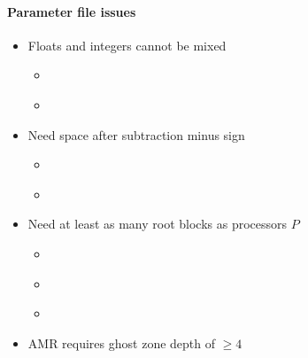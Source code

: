 \begin{frame}[fragile]
\secframetitle{\ssParamIntro}
\framesubtitle{Parameter file issues}

\begin{itemize}
   \item Floats and integers cannot be mixed
   \begin{itemize}
     \item[\frownie] \textcolor{red}{}
     \item[\smiley] \textcolor{green!50!black}{}
   \end{itemize}

   \item Need space after subtraction minus sign
   \begin{itemize}
     \item[\frownie] \textcolor{red}{}
     \item[\smiley] \textcolor{green!50!black}{}
   \end{itemize}
  \item Need at least as many root blocks as processors $P$
  \begin{itemize}
    \item {}
    \item[\frownie] \textcolor{red}{ }
    \item[\smiley]\textcolor{green!50!black}{ }
  \end{itemize}
  \item AMR requires ghost zone depth of $\ge 4$
\end{itemize}


\end{frame}


